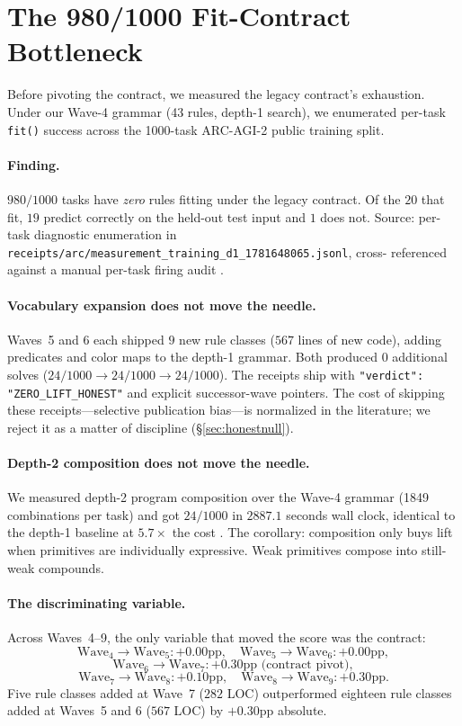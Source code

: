 \documentclass[11pt]{article}
\begin{document}
\section{The 980/1000 Fit-Contract Bottleneck}
\label{sec:bottleneck}

Before pivoting the contract, we measured the legacy contract's
exhaustion. Under our Wave-4 grammar (43 rules, depth-1 search), we
enumerated per-task \texttt{fit()} success across the 1000-task ARC-AGI-2
public training split.

\paragraph{Finding.}
$980 / 1000$ tasks have \emph{zero} rules fitting under the legacy
contract. Of the $20$ that fit, $19$ predict correctly on the held-out
test input and $1$ does not. Source: per-task diagnostic enumeration in
\texttt{receipts/arc/measurement\_training\_d1\_1781648065.jsonl}, cross-
referenced against a manual per-task firing audit \cite{innovations}.

\paragraph{Vocabulary expansion does not move the needle.}
Waves~5 and 6 each shipped $9$ new rule classes ($567$ lines of new
code), adding predicates and color maps to the depth-1 grammar.
Both produced $0$ additional solves
($24/1000 \to 24/1000 \to 24/1000$). The receipts ship with
\texttt{"verdict": "ZERO\_LIFT\_HONEST"} and explicit successor-wave
pointers. The cost of skipping these receipts---selective publication
bias---is normalized in the literature; we reject it as a matter of
discipline (\S\ref{sec:honestnull}).

\paragraph{Depth-2 composition does not move the needle.}
We measured depth-2 program composition over the Wave-4 grammar (1849
combinations per task) and got $24/1000$ in $2887.1$ seconds wall clock,
identical to the depth-1 baseline at $5.7\times$ the cost
\cite{wave7receipt}. The corollary: composition only buys lift when
primitives are individually expressive. Weak primitives compose into
still-weak compounds.

\paragraph{The discriminating variable.}
Across Waves~4--9, the only variable that moved the score was the
contract:
\[
  \mathrm{Wave}_4 \to \mathrm{Wave}_5: +0.00\text{pp},\quad
  \mathrm{Wave}_5 \to \mathrm{Wave}_6: +0.00\text{pp},
\]
\[
  \mathrm{Wave}_6 \to \mathrm{Wave}_7: +0.30\text{pp (contract pivot)},
\]
\[
  \mathrm{Wave}_7 \to \mathrm{Wave}_8: +0.10\text{pp},\quad
  \mathrm{Wave}_8 \to \mathrm{Wave}_9: +0.30\text{pp}.
\]
Five rule classes added at Wave~7 ($282$ LOC) outperformed eighteen rule
classes added at Waves~5 and 6 ($567$ LOC) by $+0.30$pp absolute.
\end{document}
